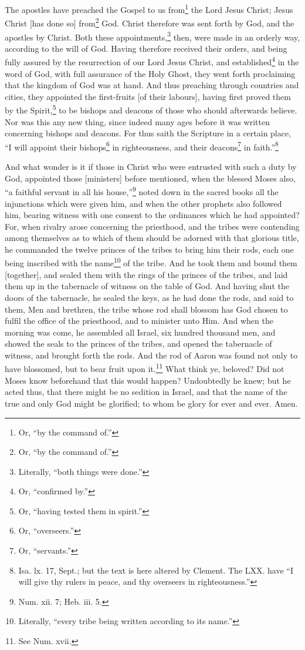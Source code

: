 The apostles have preached the Gospel to us from\footnote{Or, “by the command of.”} the Lord Jesus Christ; Jesus Christ [has done so] from\footnote{Or, “by the command of.”} God. Christ therefore was sent forth by God, and the apostles by Christ. Both these appointments,\footnote{Literally, “both things were done.”} then, were made in an orderly way, according to the will of God. Having therefore received their orders, and being fully assured by the resurrection of our Lord Jesus Christ, and established\footnote{Or, “confirmed by.”} in the word of God, with full assurance of the Holy Ghost, they went forth proclaiming that the kingdom of God was at hand. And thus preaching through countries and cities, they appointed the first-fruits [of their labours], having first proved them by the Spirit,\footnote{Or, “having tested them in spirit.”} to be bishops and deacons of those who should afterwards believe. Nor was this any new thing, since indeed many ages before it was written concerning bishops and deacons. For thus saith the Scripture in a certain place, “I will appoint their bishops\footnote{Or, “overseers.”} in righteousness, and their deacons\footnote{Or, “servants.”} in faith.”\footnote{Isa. lx. 17, Sept.; but the text is here altered by Clement. The LXX. have “I will give thy rulers in peace, and thy overseers in righteousness.”}


And what wonder is it if those in Christ who were entrusted with such a duty by God, appointed those [ministers] before mentioned, when the blessed Moses also, “a faithful servant in all his house,”\footnote{Num. xii. 7; Heb. iii. 5.} noted down in the sacred books all the injunctions which were given him, and when the other prophets also followed him, bearing witness with one consent to the ordinances which he had appointed? For, when rivalry arose concerning the priesthood, and the tribes were contending among themselves as to which of them should be adorned with that glorious title, he commanded the twelve princes of the tribes to bring him their rods, each one being inscribed with the name\footnote{Literally, “every tribe being written according to its name.”} of the tribe. And he took them and bound them [together], and sealed them with the rings of the princes of the tribes, and laid them up in the tabernacle of witness on the table of God. And having shut the doors of the tabernacle, he sealed the keys, as he had done the rods, and said to them, Men and brethren, the tribe whose rod shall blossom has God chosen to fulfil the office of the priesthood, and to minister unto Him. And when the morning was come, he assembled all Israel, six hundred thousand men, and showed the seals to the princes of the tribes, and opened the tabernacle of witness, and brought forth the rods. And the rod of Aaron was found not only to have blossomed, but to bear fruit upon it.\footnote{See Num. xvii.} What think ye, beloved? Did not Moses know beforehand that this would happen? Undoubtedly he knew; but he acted thus, that there might be no sedition in Israel, and that  the name of the true and only God might be glorified; to whom be glory for ever and ever. Amen.

